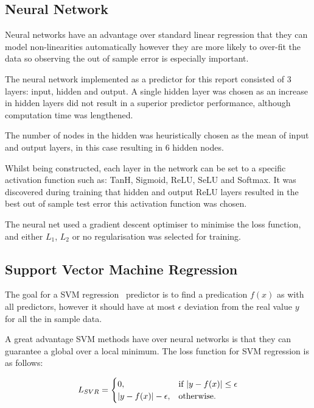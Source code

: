 \documentclass[10pt,twocolumn,letterpaper]{article}
\DeclarePairedDelimiter\abs{\lvert}{\rvert}%
\begin{document}
\subsection{Neural Network}
Neural networks have an advantage over standard linear regression that they can model non-linearities automatically however they are more likely to over-fit the data so observing the out of sample error is especially important.

The neural network implemented as a predictor for this report consisted of 3 layers: input, hidden and output. A single hidden layer was chosen as an increase in hidden layers did not result in a superior predictor performance, although computation time was lengthened.

The number of nodes in the hidden was heuristically chosen as the mean of input and output layers, in this case resulting in 6 hidden nodes.

Whilst being constructed, each layer in the network can be set to a specific activation function such as: TanH, Sigmoid, ReLU, SeLU and Softmax. It was discovered during training that hidden and output ReLU layers resulted in the best out of sample test error this activation function was chosen. 

The neural net used a gradient descent optimiser to minimise the loss function, and either $L_1$, $L_2$ or no regularisation was selected for training. 

\subsection{Support Vector Machine Regression}


The goal for a SVM regression~\cite{Cortes1995} predictor is to find a predication $f(x)$ as with all predictors, however it should have at most $\epsilon$ deviation from the real value $y$ for all the in sample data.

A great advantage SVM methods have over neural networks is that they can guarantee a global over a local minimum. The loss function for SVM regression is as follows:

\begin{equation}
L_{SVR} = \begin{cases}
0, & \text{if\ } \abs{y - f(x)} \leq \epsilon \\
\abs{y - f(x)} - \epsilon, & \text{otherwise.} \\
\end{cases}
\label{eq:svr}
\end{equation}
\end{document}
